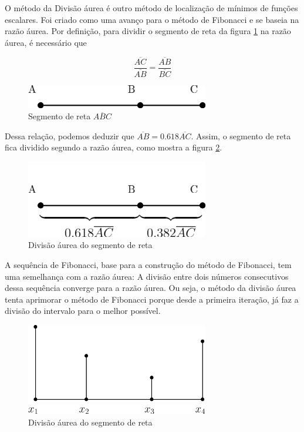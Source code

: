O método da Divisão áurea é outro método de localização de mínimos de funções escalares. Foi criado como uma avanço para o método de Fibonacci e se baseia na razão áurea. Por definição, para dividir o segmento de reta da figura \ref{fig:abc} na razão áurea, é necessário que

\begin{equation*}
\dfrac{\overline{AC}}{\overline{AB}} = \dfrac{\overline{AB}}{\overline{BC}}
\end{equation*}

\begin{figure}[h]
	\begin{center}
		\includegraphics[width=8cm]{../aurea/dots_a_b_c.png}   
		\caption{Segmento de reta $ \overline{ABC} $}
		\label{fig:abc}
	\end{center}
\end{figure}

Dessa relação, podemos deduzir que $ \overline{AB} = 0.618\overline{AC} $. Assim, o segmento de reta fica dividido segundo a razão áurea, como mostra a figura \ref{fig:aurea_abc}.

\begin{figure}[h]
	\begin{center}
		\includegraphics[width=8cm]{../aurea/dots_a_b_c_aurea.png}   
		\caption{Divisão áurea do segmento de reta}
		\label{fig:aurea_abc}
	\end{center}
\end{figure}

A sequência de Fibonacci, base para a construção do método de Fibonacci, tem uma semelhança com a razão áurea: A divisão entre dois números consecutivos dessa sequência converge para a razão áurea. Ou seja, o método da divisão áurea tenta aprimorar o método de Fibonacci porque desde a primeira iteração, já faz a divisão do intervalo para o melhor possível.

\begin{figure}[h]
	\begin{center}
		\includegraphics[width=8cm]{../aurea/aurea_fx.png}   
		\caption{Divisão áurea do segmento de reta}
		\label{fig:aurea_fx}
	\end{center}
\end{figure}

